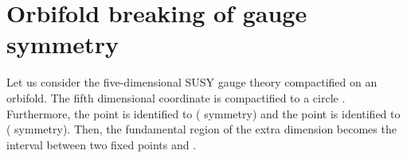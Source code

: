 \documentclass[a4paper,12pt]{article}
\begin{document}
\section{Orbifold breaking of gauge symmetry}

Let us consider the five-dimensional SUSY \coordHE{} gauge theory 
compactified
on an \coordHE{} orbifold.
The fifth dimensional coordinate \coordHE{} is compactified to a circle
\coordHE{}. Furthermore, the point \coordHE{} is identified to
\coordHE{} (\coordHE{} symmetry) and the point \coordHE{} is identified
to \coordHE{} (\coordHE{} symmetry).
Then, the fundamental region of
the extra dimension becomes the interval \myHighlight{$[0,\frac{\pi R}{2}]$}\coordHE{}
between two fixed points \coordHE{} and \coordHE{}.
\end{document}
